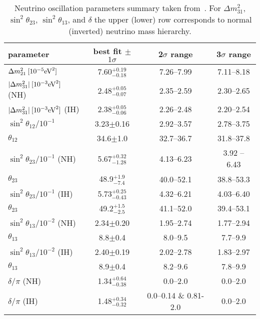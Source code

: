 \begin{table}[h]\centering
   \begin{tabular}{lccc}
    \hline
    parameter & best fit $\pm$ $1\sigma$ &  2$\sigma$ range& 3$\sigma$ range
    \\
    \hline
    $\Delta m^2_{21}\: [10^{-5}\text{eV}^2]$
    & 7.60$^{+0.19}_{-0.18}$  & 7.26--7.99 & 7.11--8.18 \\[3mm] 
    $|\Delta m^2_{31}|\: [10^{-3}\text{eV}^2]$ (NH)
    &  2.48$^{+0.05}_{-0.07}$ &  2.35--2.59 &  2.30--2.65\\
    $|\Delta m^2_{31}|\: [10^{-3}\text{eV}^2]$ (IH)
    &  2.38$^{+0.05}_{-0.06}$ &  2.26--2.48 &  2.20--2.54 \\[3mm] 
    $\sin^2\theta_{12} / 10^{-1}$
    & 3.23$\pm$0.16 & 2.92--3.57 & 2.78--3.75\\
    $\theta_{12}$ 
    & 34.6$\pm$1.0 & 32.7--36.7 & 31.8--37.8\\[3mm]  
    $\sin^2\theta_{23} / 10^{-1}$ (NH)
    &	5.67$^{+0.32}_{-1.28}$ 
    & 4.13--6.23 & 3.92 -- 6.43 \\
    $\theta_{23}$ %
    & 48.9$^{+1.9}_{-7.4}$ & 40.0--52.1 & 38.8--53.3 \\ 
    $\sin^2\theta_{23} / 10^{-1}$ (IH)
    & 5.73$^{+0.25}_{-0.43}$ & 4.32--6.21 & 4.03--6.40 \\
    $\theta_{23}$ %
    & 49.2$^{+1.5}_{-2.5}$ & 41.1--52.0 & 39.4--53.1\\[3mm]  
    $\sin^2\theta_{13} / 10^{-2}$ (NH)
    & 2.34$\pm$0.20 & 1.95--2.74 & 1.77--2.94 \\
    $\theta_{13}$ %
    &	8.8$\pm$0.4 & 8.0--9.5 & 7.7--9.9\\
    $\sin^2\theta_{13} / 10^{-2}$ (IH)
    & 2.40$\pm$0.19 & 2.02--2.78 & 1.83--2.97 \\
     $\theta_{13}$ %
     & 8.9$\pm$0.4 & 8.2--9.6 & 7.8--9.9\\[3mm]
   $\delta/\pi$ (NH)
   	& 1.34$^{+0.64}_{-0.38}$ & 0.0--2.0 & 0.0--2.0 \\
   $\delta/\pi$ (IH)	
   	& 1.48$^{+0.34}_{-0.32}$ & 0.0--0.14 \& 0.81-2.0 & 0.0--2.0 \\	
       \hline
     \end{tabular}
     \caption{ \label{tab:summary} Neutrino oscillation parameters
       summary taken from~\cite{Forero:2014bxa}. For $\Delta m^2_{31}$, $\sin^2\theta_{23}$, $\sin^2\theta_{13}$, 
       and $\delta$ the upper (lower) row corresponds to normal (inverted)
       neutrino mass hierarchy.}
\label{tab:neutrino-parameters}
\end{table}











